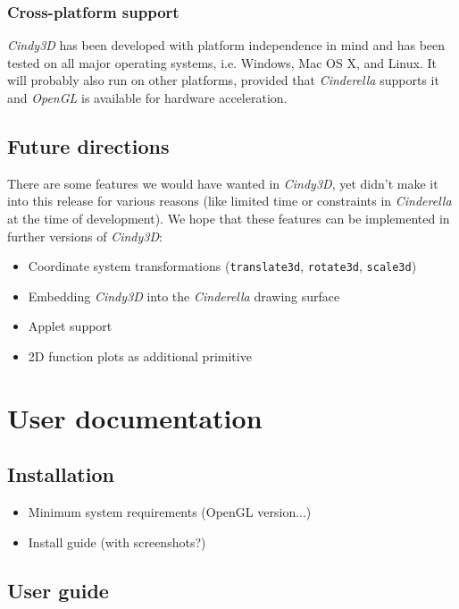 \documentclass[appendixprefix,a4paper]{scrreprt}
\begin{document}
\subsection{Cross-platform support}

\emph{Cindy3D} has been developed with platform independence in mind and has 
been tested on all major operating systems, i.e. Windows, Mac OS X, and Linux. 
It will probably also run on other platforms, provided that \emph{Cinderella} 
supports it and \emph{OpenGL} is available for hardware acceleration.

\section{Future directions}

There are some features we would have wanted in \emph{Cindy3D}, yet didn't 
make it into this release for various reasons (like limited time or 
constraints in \emph{Cinderella} at the time of development). We hope that 
these features can be implemented in further versions of \emph{Cindy3D}:

\begin{itemize}
\item Coordinate system transformations (\texttt{translate3d}, 
\texttt{rotate3d}, \texttt{scale3d})
\item Embedding \emph{Cindy3D} into the \emph{Cinderella} drawing surface
\item Applet support
\item 2D function plots as additional primitive
\end{itemize}


\chapter{User documentation}
\label{chap:userdoc}

\section{Installation}

\begin{itemize}
\item Minimum system requirements (OpenGL version...)
\item Install guide (with screenshots?)
\end{itemize}

\section{User guide}
\label{sec:userguide}
\end{document}

